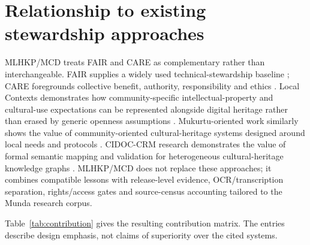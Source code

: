 \documentclass[11pt]{article}
\begin{document}
\section{Relationship to existing stewardship approaches}
MLHKP/MCD treats FAIR and CARE as complementary rather than interchangeable. FAIR supplies a widely used technical-stewardship baseline \parencite{wilkinson2016fair}; CARE foregrounds collective benefit, authority, responsibility and ethics \parencite{carroll2020care}. Local Contexts demonstrates how community-specific intellectual-property and cultural-use expectations can be represented alongside digital heritage rather than erased by generic openness assumptions \parencite{christen2015localcontexts}. Mukurtu-oriented work similarly shows the value of community-oriented cultural-heritage systems designed around local needs and protocols \parencite{dutta2022mukurtu}. CIDOC-CRM research demonstrates the value of formal semantic mapping and validation for heterogeneous cultural-heritage knowledge graphs \parencite{faraj2021cidoc}. MLHKP/MCD does not replace these approaches; it combines compatible lessons with release-level evidence, OCR/transcription separation, rights/access gates and source-census accounting tailored to the Munda research corpus.

Table~\ref{tab:contribution} gives the resulting contribution matrix. The entries describe design emphasis, not claims of superiority over the cited systems.
\end{document}
